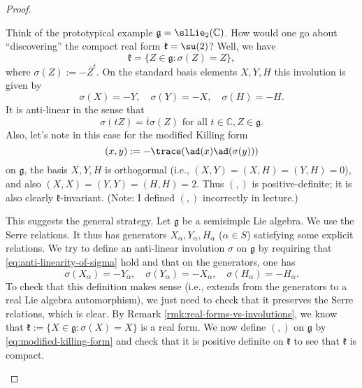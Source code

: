 \documentclass[reqno]{amsart} 
\begin{document}
\begin{proof}
\begin{enumerate}
    Think of the prototypical example $\mathfrak{g} = \slLie_2(\mathbb{C})$.  How would one go about ``discovering'' the compact real form $\mathfrak{k} = \su(2)$?  Well, we have
    \begin{equation*}
      \mathfrak{k} = \{Z \in \mathfrak{g} : \sigma(Z) = Z\},
    \end{equation*}
    where $\sigma(Z) := -\overline{Z}^t$.  On the standard basis elements $X,Y,H$ this involution is given by
    \begin{equation*}
      \sigma(X) = -Y, \quad \sigma(Y) = -X, \quad \sigma(H) = -H.
    \end{equation*}
    It is anti-linear in the sense that
    \begin{equation}\label{eq:anti-linearity-of-sigma}
      \sigma(t Z) = \overline{t} \sigma(Z) \text{ for all }
      t \in \mathbb{C}, Z \in \mathfrak{g}.
    \end{equation}
    Also, let's note in this case for the modified Killing form
    \begin{equation}\label{eq:modified-killing-form}
      (x,y) := -\trace(\ad(x) \ad(\sigma(y)))
    \end{equation}
    on $\mathfrak{g}$, the basis $X,Y,H$ is orthogormal (i.e., $(X,Y) = (X,H) = (Y,H) = 0$), and also $(X,X) = (Y,Y) = (H,H) = 2$.  Thus $(,)$ is positive-definite; it is also clearly $\mathfrak{k}$-invariant.  (Note: I defined $(,)$ incorrectly in lecture.)

    This suggests the general strategy.  Let $\mathfrak{g}$ be a semisimple Lie algebra.  We use the Serre relations.  It thus has generators $X_\alpha, Y_\alpha, H_\alpha$ ($\alpha \in S$) satisfying some explicit relations.  We try to define an anti-linear involution $\sigma$ on $\mathfrak{g}$ by requiring that \eqref{eq:anti-linearity-of-sigma} hold and that on the generators, one has
    \begin{equation*}
      \sigma(X_\alpha) = -Y_\alpha, \quad \sigma(Y_\alpha) = -X_\alpha, \quad \sigma(H_\alpha) = -H_\alpha.
    \end{equation*}
    To check that this definition makes sense (i.e., extends from the generators to a real Lie algebra automorphism), we just need to check that it preserves the Serre relations, which is clear.  By Remark \ref{rmk:real-forms-vs-involutions}, we know that $\mathfrak{k} := \{X \in \mathfrak{g} : \sigma(X) = X\}$ is a real form.  We now define $(,)$ on $\mathfrak{g}$ by \eqref{eq:modified-killing-form} and check that it is positive definite on $\mathfrak{k}$ to see that $\mathfrak{k}$ is compact.
  \end{enumerate}
\end{proof}
\end{document}
